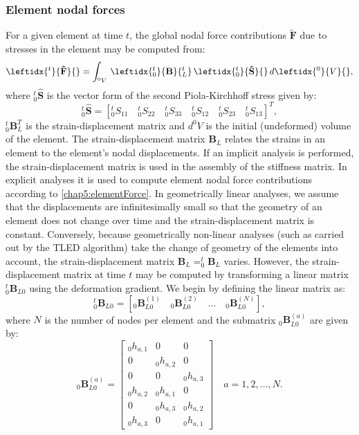 		\subsubsection*{Element nodal forces}
For a given element at time $ t $, the global nodal force contributions $ \mathbf{\tilde{F}} $ due to stresses in the element may be computed from:
\begin{equation}
\label{chap5:elementForce}
\leftidx{^t}{ \mathbf{\tilde{F}} }{} = \int_{^0 V} \, \leftidx{_0^t}{ \mathbf{B} }{_L^t} \, \leftidx{_0^t}{ \mathbf{\hat{S}} }{} \, d\leftidx{^0}{ V }{},
\end{equation}
where $ _0^t\mathbf{\hat{S}} $ is the vector form of the second Piola-Kirchhoff stress given by:
\begin{equation}
_0^t\mathbf{\hat{S}} = \left[ _0^t S_{11} \quad _0^t S_{22} \quad _0^t S_{33} \quad _0^t S_{12} \quad _0^t S_{23} \quad _0^t S_{13} \right] ^T,
\end{equation}
$ _0^t\mathbf{B}^T_L $ is the strain-displacement matrix and $ d^0V $ is the initial (undeformed) volume of the element. The strain-displacement matrix $ \mathbf{B}_L $ relates the strains in an element to the element's nodal displacements. If an implicit analysis is performed, the strain-displacement matrix is used in the assembly of the stiffness matrix. In explicit analyses it is used to compute element nodal force contributions according to \eqref{chap5:elementForce}. In geometrically linear analyses, we assume that the displacements are infinitesimally small so that the geometry of an element does not change over time and the strain-displacement matrix is constant. Conversely, because geometrically non-linear analyses (such as carried out by the TLED algorithm) take the change of geometry of the elements into account, the strain-displacement matrix $ \mathbf{B}_L = _0^t\mathbf{B}_L $ varies. However, the strain-displacement matrix at time $ t $ may be computed by transforming a linear matrix $ _0^t\mathbf{B}_{L0} $ using the deformation gradient. We begin by defining the linear matrix as:
\begin{equation}
_0^t\mathbf{B}_{L0} = \left[ _0\mathbf{B}_{L0}^{(1)} \quad _0\mathbf{B}_{L0}^{(2)} \quad \ldots \quad _0\mathbf{B}_{L0}^{(N)} \right],
\end{equation}
where $ N $ is the number of nodes per element and the submatrix $ _0\mathbf{B}_{L0}^{(a)}  $ are given by:
\begin{equation}
_0\mathbf{B}_{L0}^{(a)} =
	\begin{bmatrix}
	_0 h_{a,1} & 0 & 0 \\
	0 & _0 h_{a,2} & 0 \\
	0 & 0 & _0 h_{a,3} \\
	_0 h_{a,2} & _0 h_{a,1} & 0 \\
	0 & _0 h_{a,3} & _0 h_{a,2} \\
	_0 h_{a,3} & 0 & _0 h_{a,1}
	\end{bmatrix}
\quad a = 1, 2, \ldots, N.
\end{equation}
